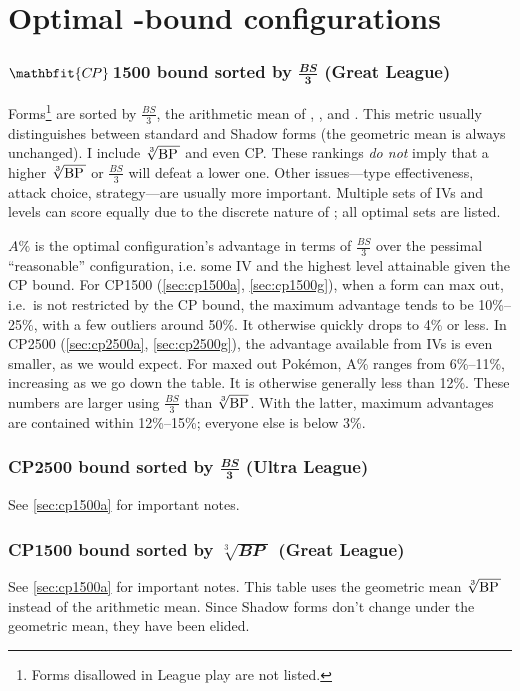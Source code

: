 \chapter{Optimal \CP-bound configurations\label{chap:optimal}}
\subsection[\CP1500 bound sorted by $\frac{\mathit{BS}}{3}$ (Great League)]%
{$\mathbfit{C\kern -1ptP}$\,1500 bound sorted by $\frac{\mathbfit{BS}}{\mathbf3}$ (Great League)\label{sec:cp1500a}}

Forms\footnote{Forms disallowed in League play are not listed.} are sorted by $\frac{\mathit{BS}}{3}$,
  the arithmetic mean of , , and \MHP\@.
This metric usually distinguishes between standard and Shadow forms (the geometric mean is always unchanged).
I include $\sqrt[3]{\BP\,}$ and even CP\@.
These rankings \textit{do not} imply that a higher $\sqrt[3]{\BP\,}$ or $\frac{\mathit{BS}}{3}$
  will defeat a lower one.
Other issues---type effectiveness, attack choice, strategy---are usually more important.
Multiple sets of IVs and levels can score equally due to the discrete nature of \MHP\@; all optimal sets are listed.

$A\%$ is the optimal configuration's advantage in terms of $\frac{BS}{3}$
  over the pessimal ``reasonable'' configuration, i.e. some IV
  and the highest level attainable given the CP bound.
For CP1500 (\autoref{sec:cp1500a}, \autoref{sec:cp1500g}), when a form can max out, i.e.\ is not restricted by the CP bound,
  the maximum advantage tends to be 10\%--25\%, with a few outliers around 50\%.
It otherwise quickly drops to 4\% or less.
In CP2500 (\autoref{sec:cp2500a}, \autoref{sec:cp2500g}), the advantage available from IVs is even smaller, as we would expect.
For maxed out Pokémon, A\% ranges from 6\%--11\%, increasing as we go down the table.
It is otherwise generally less than 12\%.
These numbers are larger using $\frac{\mathit{BS}}{3}$ than $\sqrt[3]{\mbox{BP}}$.
With the latter, maximum advantages are contained within 12\%--15\%; everyone else is below 3\%.

\subsection[CP2500 bound sorted by $\frac{\mathit{BS}}{3}$ (Ultra League)]%
{CP2500 bound sorted by $\frac{\mathbfit{BS}}{\mathbf3}$ (Ultra League)\label{sec:cp2500a}}
See \autoref{sec:cp1500a} for important notes.

\subsection[CP1500 bound sorted by \protect{$\sqrt[3]{\BP\,}$} (Great League)]%
{CP1500 bound sorted by $\sqrt[3]{\mathbfit{BP}\;}$ (Great League)\label{sec:cp1500g}}
See \autoref{sec:cp1500a} for important notes.
This table uses the geometric mean $\sqrt[3]{\BP\,}$ instead of the arithmetic mean.
Since Shadow forms don't change under the geometric mean, they have been elided.

